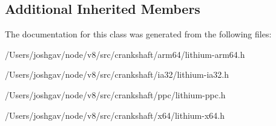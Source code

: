 \subsection*{Additional Inherited Members}


The documentation for this class was generated from the following files\+:\begin{DoxyCompactItemize}
\item 
/\+Users/joshgav/node/v8/src/crankshaft/arm64/lithium-\/arm64.\+h\item 
/\+Users/joshgav/node/v8/src/crankshaft/ia32/lithium-\/ia32.\+h\item 
/\+Users/joshgav/node/v8/src/crankshaft/ppc/lithium-\/ppc.\+h\item 
/\+Users/joshgav/node/v8/src/crankshaft/x64/lithium-\/x64.\+h\end{DoxyCompactItemize}
